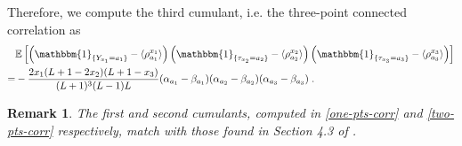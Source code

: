 \documentclass[10pt]{article}
\numberwithin{equation}{section}
\numberwithin{equation}{subsection}
\newtheorem{remark}{Remark}
\newcommand{\dt}{\;.}
\newcommand{\com}[1]{{ (* {\color{red}\small #1}*)}}
\begin{document}
Therefore, we compute the third cumulant, i.e. the three-point connected correlation as 
\begin{align}
	&\mathbb{E}\left[\left(\mathbbm{1}_{\{Y_{x_{1}}=a_{1}\}}-\langle\rho_{a_{1}}^{x_{1}}\rangle \right)\left(\mathbbm{1}_{\{\tau_{x_{2}}=a_{2}\}}-\langle\rho_{a_{2}}^{x_{2}}\rangle \right)\left(\mathbbm{1}_{\{\tau_{x_{3}}=a_{3}\}}-\langle\rho_{a_{3}}^{x_{3}}\rangle \right)\right]\nonumber\\
	=&-\frac{2x_{1}(L+1-2x_{2})(L+1-x_{3})}{(L+1)^{3}(L-1)L}(\alpha_{a_{1}}-\beta_{a_{1}})(\alpha_{a_{2}}-\beta_{a_{2}})(\alpha_{a_{3}}-\beta_{a_{3}})\dt
\end{align}
\begin{remark} The first and second cumulants, computed in \eqref{one-pts-corr} and \eqref{two-pts-corr} respectively, match with those found in Section 4.3 of \cite{vanicat2017exact}.
	\end{remark}
\begin{comment}
{\color{blue}We aim to find an explicit for for the steady state $|\Psi\rangle$. The MPA gives the steady state in terms of an abstract algebra of operators. If an explicit representation of $(X_{a})_{a=1,\ldots,N}$ was available, it would be possible to compute explicitly all the correlations and currents of particles for the Hamiltonian \eqref{hamiltonian}. Another way of computing this steady state, without passing through a representation, is using the commutators \eqref{bula} and the actions \eqref{leftBoundary} and \eqref{rightBoundary}. For the one and two point correlation and for the currents this has been done in \cite{vanicat2017exact}. Inspired by this last reference, in this subsection, we aim to find exact formulas for the steady state  $|\Psi\rangle$ using only the \eqref{bula}, \eqref{leftBoundary} and \eqref{rightBoundary}. In subsection~\ref{correlation-section}, this result will leads to exact correlation for arbitrary number of particles of type $\{2,\ldots,N\}$. This aim will be achieved by the help of a similarity transformation $\mathcal{S}$ that makes commutation relations simpler, and allows to find the steady state $|\widetilde\Psi\rangle$ of a transformed Hamiltonian, denoted  $\mathbb{H}$, with lower-triangular left boundary and diagonal right boundary. Therefore, inverting this similarity, one can retrieve the steady state of \eqref{hamiltonian}. A fundamental 'ingredient' of these computation is duality, that has been proved in section~\ref{sectionDuality}. Indeed, the similarity transformation $\mathcal{S}$ relies on an "intermediate transformation" $V$ (see \eqref{transformationV}) that is, up to the diagonal operator $R$, the duality matrix.} \com{clarify}
\end{comment}
\end{document}
